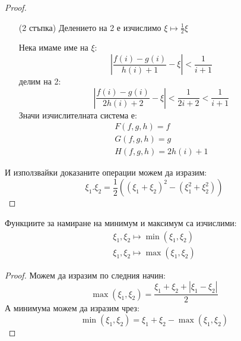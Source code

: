 \begin{proof}
\begin{itemize}
        \item[(2 стъпка)] Делението на 2 е изчислимо $\xi \mapsto \frac{1}{2}\xi$

        Нека имаме име на $\xi$:
        \begin{equation}
            \left|\frac{f(i) - g(i)}{h(i) + 1} - \xi\right| < \frac{1}{i+1}
        \end{equation}
        делим на 2:
        \begin{equation}
            \left|\frac{f(i) - g(i)}{2h(i) + 2} - \xi\right| < \frac{1}{2i+2} < \frac{1}{i+1}
        \end{equation}
        Значи изчислителната система е:
        \begin{equation}
            \begin{split}
                F(f, g, h) = f \\
                G(f, g, h) = g \\
                H(f, g, h) = 2h(i) + 1
            \end{split}
        \end{equation}
    \end{itemize}

    И използвайки доказаните операции можем да изразим:
    \begin{equation}
        \xi_1.\xi_2 = \frac{1}{2}\left((\xi_1 + \xi_2)^2 - (\xi_1^2 + \xi_2^2)\right)
    \end{equation}
\end{proof}

\begin{corollary}
    Функциите за намиране на минимум и максимум са изчислими:
    \begin{equation}
        \begin{split}
            \xi_1, \xi_2 \mapsto \min(\xi_1, \xi_2) \\
            \xi_1, \xi_2 \mapsto \max(\xi_1, \xi_2)
        \end{split}
    \end{equation}
\end{corollary}
\begin{proof}
    Можем да изразим по следния начин:
    \begin{equation}
        \max(\xi_1, \xi_2) = \frac{\xi_1 + \xi_2 + |\xi_1 - \xi_2|}{2}
    \end{equation}
    А минимума можем да изразим чрез:
    \begin{equation}
        \min(\xi_1, \xi_2) = \xi_1 + \xi_2 - \max(\xi_1, \xi_2)
    \end{equation}
\end{proof}

